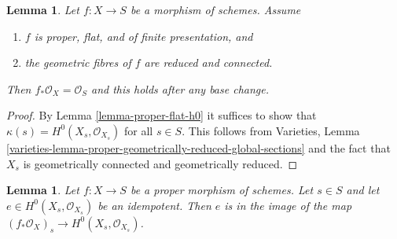 \documentclass{stacks-project}
\theoremstyle{plain}
\newtheorem{lemma}[subsection]{Lemma}
\theoremstyle{definition}
\theoremstyle{remark}
\numberwithin{equation}{subsection}
\begin{document}
\begin{lemma}
\label{lemma-proper-flat-geom-red-connected}
Let $f : X \to S$ be a morphism of schemes. Assume
\begin{enumerate}
\item $f$ is proper, flat, and of finite presentation, and
\item the geometric fibres of $f$ are reduced and connected.
\end{enumerate}
Then $f_*\mathcal{O}_X = \mathcal{O}_S$ and this holds
after any base change.
\end{lemma}

\begin{proof}
By Lemma \ref{lemma-proper-flat-h0}
it suffices to show that $\kappa(s) = H^0(X_s, \mathcal{O}_{X_s})$
for all $s \in S$. This follows from
Varieties, Lemma
\ref{varieties-lemma-proper-geometrically-reduced-global-sections}
and the fact that $X_s$ is geometrically connected and geometrically reduced.
\end{proof}

\begin{lemma}
\label{lemma-proper-idempotent-on-fibre}
Let $f : X \to S$ be a proper morphism of schemes. Let $s \in S$
and let $e \in H^0(X_s, \mathcal{O}_{X_s})$ be an idempotent.
Then $e$ is in the image of the map
$(f_*\mathcal{O}_X)_s \to H^0(X_s, \mathcal{O}_{X_s})$.
\end{lemma}
\end{document}
